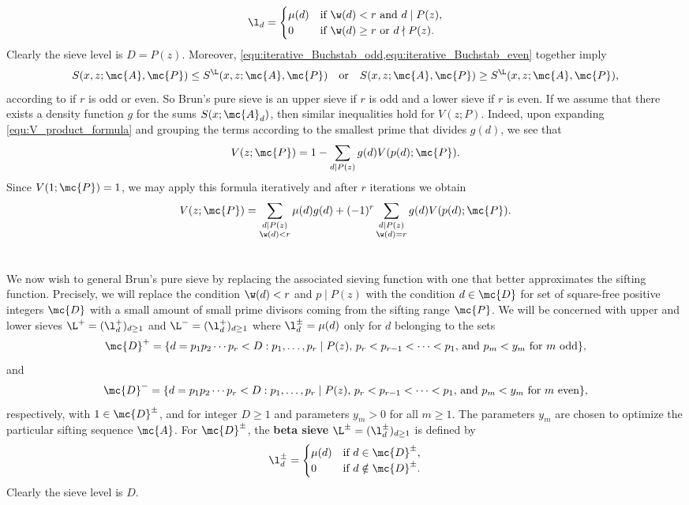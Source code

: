     \[
      \l_{d} = \begin{cases} \mu(d) & \text{if $\w(d) < r$ and $d \mid P(z)$}, \\ 0 & \text{if $\w(d) \ge r$ or $d \nmid P(z)$}. \end{cases}
    \]
    Clearly the sieve level is $D = P(z)$. Moreover, \cref{equ:iterative_Buchstab_odd,equ:iterative_Buchstab_even} together imply
    \[
      S(x,z;\mc{A},\mc{P}) \le S^{\L}(x,z;\mc{A},\mc{P}) \quad \text{or} \quad S(x,z;\mc{A},\mc{P}) \ge S^{\L}(x,z;\mc{A},\mc{P}),
    \]
    according to if $r$ is odd or even. So Brun's pure sieve is an upper sieve if $r$ is odd and a lower sieve if $r$ is even. If we assume that there exists a density function $g$ for the sums $S(x;\mc{A}_{d})$, then similar inequalities hold for $V(z;P)$. Indeed, upon expanding \cref{equ:V_product_formula} and grouping the terms according to the smallest prime that divides $g(d)$, we see that
    \[
      V(z;\mc{P}) = 1-\sum_{d \mid P(z)}g(d)V(p(d);\mc{P}).
    \]
    Since $V(1;\mc{P}) = 1$, we may apply this formula iteratively and after $r$ iterations we obtain
    \[
      V(z;\mc{P}) = \sum_{\substack{d \mid P(z) \\ \w(d) < r}}\mu(d)g(d)+(-1)^{r}\sum_{\substack{d \mid P(z) \\ \w(d) = r}}g(d)V(p(d);\mc{P}).
    \]
  \section{}
    We now wish to general Brun's pure sieve by replacing the associated sieving function with one that better approximates the sifting function. Precisely, we will replace the condition $\w(d) < r$ and $p \mid P(z)$ with the condition $d \in \mc{D}$ for set of square-free positive integers $\mc{D}$ with a small amount of small prime divisors coming from the sifting range $\mc{P}$. We will be concerned with upper and lower sieves $\L^{+} = (\l_{d}^{+})_{d \ge 1}$ and $\L^{-} = (\l_{d}^{+})_{d \ge 1}$ where $\l_{d}^{\pm} = \mu(d)$ only for $d$ belonging to the sets
    \[
      \mc{D}^{+} = \{d = p_{1}p_{2} \cdots p_{r} < D:\text{$p_{1},\ldots,p_{r} \mid P(z)$, $p_{r} < p_{r-1} < \cdots < p_{1}$, and $p_{m} < y_{m}$ for $m$ odd}\},
    \]
    and
    \[
      \mc{D}^{-} = \{d = p_{1}p_{2} \cdots p_{r} < D:\text{$p_{1},\ldots,p_{r} \mid P(z)$, $p_{r} < p_{r-1} < \cdots < p_{1}$, and $p_{m} < y_{m}$ for $m$ even}\},
    \]
    respectively, with $1 \in \mc{D}^{\pm}$, and for integer $D \ge 1$ and parameters $y_{m} > 0$ for all $m \ge 1$. The parameters $y_{m}$ are chosen to optimize the particular sifting sequence $\mc{A}$. For $\mc{D}^{\pm}$, the \textbf{beta sieve} $\L^{\pm} = (\l_{d}^{\pm})_{d \ge 1}$ is defined by
    \[
      \l_{d}^{\pm} = \begin{cases} \mu(d) & \text{if $d \in \mc{D}^{\pm}$}, \\ 0 & \text{if $d \notin \mc{D}^{\pm}$}. \end{cases}
    \]
    Clearly the sieve level is $D$. 
    
